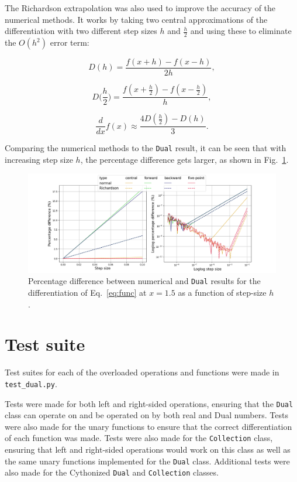 \documentclass[11pt,a4paper]{article}
\begin{document}
The Richardson extrapolation was also used to improve the accuracy of the numerical methods. It works by taking two central approximations of the differentiation with two different step sizes $h$ and $\frac{h}{2}$ and using these to eliminate the $O(h^2)$ error term:

\begin{equation}
    D(h) = \frac{f(x+h) - f(x-h)}{2h}, 
\end{equation}

\begin{equation}
    D\biggl(\frac{h}{2}\biggr) = \frac{f(x+\frac{h}{2}) - f(x-\frac{h}{2})}{h}, 
\end{equation}

\begin{equation}
    \frac{d}{dx} f(x) \approx \frac{4 D(\frac{h}{2}) - D(h)}{3}.
\end{equation}

Comparing the numerical methods to the \texttt{Dual} result, it can be seen that with increasing step size $h$, the percentage difference gets larger, as shown in Fig.~\ref{fig:pdiff}.

\begin{figure}
    \centering
    \includegraphics[width=\columnwidth, keepaspectratio]{../percentage_difference.png}
    \caption{Percentage difference between numerical and \texttt{Dual} results for the differentiation of Eq.~\ref{eq:func} at $x=1.5$ as a function of step-size $h$.}
    \label{fig:pdiff}
\end{figure}
\clearpage
\section{Test suite}
Test suites for each of the overloaded operations and functions were made in \texttt{test\_dual.py}.

Tests were made for both left and right-sided operations, ensuring that the \texttt{Dual} class can operate on and be operated on by both real and Dual numbers. Tests were also made for the unary functions to ensure that the correct differentiation of each function was made. Tests were also made for the \texttt{Collection} class, ensuring that left and right-sided operations would work on this class as well as the same unary functions implemented for the \texttt{Dual} class. Additional tests were also made for the Cythonized \texttt{Dual} and \texttt{Collection} classes.
\end{document}

